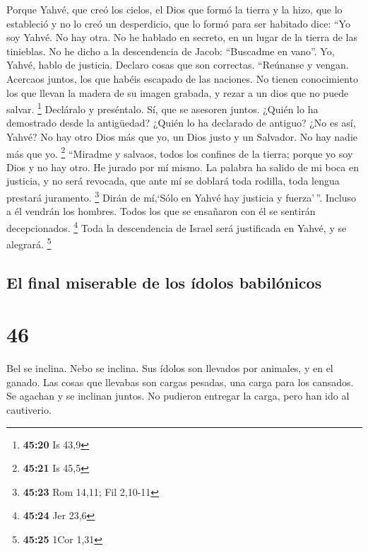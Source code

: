  Porque Yahvé, que creó los cielos, el Dios que formó la
tierra y la hizo, que lo estableció y no lo creó un desperdicio, que lo
formó para ser habitado dice: ``Yo soy Yahvé. No hay otra.
 No he hablado en secreto, en un lugar de la tierra de
las tinieblas. No he dicho a la descendencia de Jacob: ``Buscadme en
vano''. Yo, Yahvé, hablo de justicia. Declaro cosas que son correctas.
 ``Reúnanse y vengan. Acercaos juntos, los que habéis
escapado de las naciones. No tienen conocimiento los que llevan la
madera de su imagen grabada, y rezar a un dios que no puede salvar.
\footnote{\textbf{45:20} Is 43,9}  Decláralo y
preséntalo. Sí, que se asesoren juntos. ¿Quién lo ha demostrado desde la
antigüedad? ¿Quién lo ha declarado de antiguo? ¿No es así, Yahvé? No hay
otro Dios más que yo, un Dios justo y un Salvador. No hay nadie más que
yo. \footnote{\textbf{45:21} Is 45,5}  ``Miradme y
salvaos, todos los confines de la tierra; porque yo soy Dios y no hay
otro.  He jurado por mí mismo. La palabra ha salido de mi
boca en justicia, y no será revocada, que ante mí se doblará toda
rodilla, toda lengua prestará juramento. \footnote{\textbf{45:23} Rom
  14,11; Fil 2,10-11}  Dirán de mí,`Sólo en Yahvé hay
justicia y fuerza'\,''. Incluso a él vendrán los hombres. Todos los que
se ensañaron con él se sentirán decepcionados. \footnote{\textbf{45:24}
  Jer 23,6}  Toda la descendencia de Israel será
justificada en Yahvé, y se alegrará. \footnote{\textbf{45:25} 1Cor 1,31}

\hypertarget{el-final-miserable-de-los-uxeddolos-babiluxf3nicos}{%
\subsection{El final miserable de los ídolos
babilónicos}\label{el-final-miserable-de-los-uxeddolos-babiluxf3nicos}}

\hypertarget{section-45}{%
\section{46}\label{section-45}}

 Bel se inclina. Nebo se inclina. Sus ídolos son llevados
por animales, y en el ganado. Las cosas que llevabas son cargas pesadas,
una carga para los cansados.  Se agachan y se inclinan
juntos. No pudieron entregar la carga, pero han ido al cautiverio.

